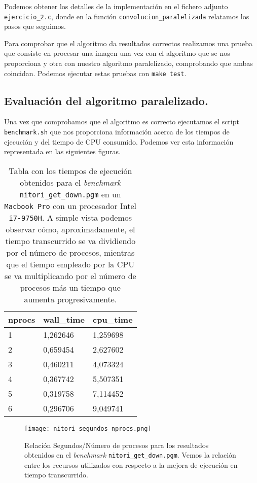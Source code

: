 Podemos obtener los detalles de la implementación en el fichero adjunto \texttt{ejercicio\_2.c}, donde en
la función \texttt{convolucion\_paralelizada} relatamos los pasos que seguimos.

Para comprobar que el algoritmo da resultados correctos realizamos una prueba que consiste en procesar una imagen una vez con el algoritmo
que se nos proporciona y otra con nuestro algoritmo paralelizado, comprobando que ambas coincidan. Podemos ejecutar estas pruebas con \texttt{make test}.

\subsection{Evaluación del algoritmo paralelizado.}

Una vez que comprobamos que el algoritmo es correcto ejecutamos el script \texttt{benchmark.sh} que nos proporciona
información acerca de los tiempos de ejecución y del tiempo de CPU consumido. Podemos ver esta información representada
en las siguientes figuras.

\begin{table}[!ht]
    \centering
    \begin{tabular}{|l|l|l|}
    \hline
        \textbf{nprocs} & \textbf{wall\_time} & \textbf{cpu\_time} \\ \hline
        1 & 1,262646 & 1,259698 \\ \hline
        2 & 0,659454 & 2,627602 \\ \hline
        3 & 0,460211 & 4,073324 \\ \hline
        4 & 0,367742 & 5,507351 \\ \hline
        5 & 0,319758 & 7,114452 \\ \hline
        6 & 0,296706 & 9,049741 \\ \hline
    \end{tabular}
    \caption{Tabla con los tiempos de ejecución obtenidos para el \textit{benchmark} \texttt{nitori\_get\_down.pgm} en un \texttt{Macbook Pro}
    con un procesador Intel \texttt{i7-9750H}. A simple vista podemos observar cómo, aproximadamente, el tiempo
    transcurrido se va dividiendo por el número de procesos, mientras que el tiempo empleado por la CPU se va
    multiplicando por el número de procesos más un tiempo que aumenta progresivamente.}
\end{table}


\begin{figure}[H]
    \centering
    \texttt{[image: nitori\_segundos\_nprocs.png]}
    \caption{Relación Segundos/Número de procesos para los resultados obtenidos en el \textit{benchmark} \texttt{nitori\_get\_down.pgm}.
    Vemos la relación entre los recursos utilizados con respecto a la mejora de ejecución en tiempo transcurrido.}
\end{figure}

